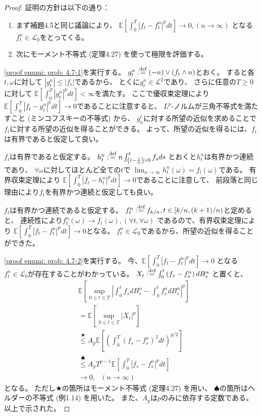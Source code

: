 \documentclass[uplatex]{jsarticle}
\theoremstyle{definition}
\def\E{\mathbb{E}}
\def\mcL{\mathcal{L}}
\def\dfn{:\overset{\mbox{{\scriptsize def}}}{=}}
\begin{document}
\begin{proof}
  証明の方針は以下の通り：
  \begin{enumerate}
    \item \label{proof enumi: prob: 4.7-1}
    まず補題4.5と同じ議論により、
    \(\E\left[ \int_0^T|f_t-f_t^n|^pdt \right]\to 0, (n\to \infty)\)
    となる\(f_t^n\in \mcL_0\)をとってくる。
    \item \label{proof enumi: prob: 4.7-2}
    次にモーメント不等式 (定理4.27) を使って極限を評価する。
  \end{enumerate}

  \ref{proof enumi: prob: 4.7-1}を実行する。
  \(g_t^n \dfn (-n)\vee (f_t\wedge n)\)とおく。
  すると各\(t,\omega\)に対して
  \(|g_t^n| \leq |f_t|\)であるから、
  とくに\(g_t^n\in \mcL^2\)であり、
  さらに任意の\(T\geq 0\)に対して
  \(\E\left[ \int_0^T|g_t^n|^pdt\right] < \infty\)を満たす。
  ここで優収束定理により
  \(\E\left[ \int_0^T|f_t-g_t^n|^pdt\right] \to 0\)であることに注意すると、
  \(L^p\)-ノルムが三角不等式を満たすこと (ミンコフスキーの不等式) から、
  \(g_n^t\)に対する所望の近似を求めることで
  \(f_t\)に対する所望の近似を得ることができる。
  よって、所望の近似を得るには、\(f_t\)は有界であると仮定して良い。

  \(f_t\)は有界であると仮定する。
  \(h_t^n \dfn n\int_{\left(t-\frac{1}{n}\right)\vee 0}^t f_sds\)
  とおくと\(h_t^n\)は有界かつ連続であり、
  \(\forall \omega\)に対してほとんど全ての\(t\)で
  \(\lim_{n\to \infty}h_t^n(\omega) = f_t(\omega)\)である。
  有界収束定理により
  \(\E\left[ \int_0^T|f_t-h_t^n|^pdt\right] \to 0\)であることに注意して、
  前段落と同じ理由により\(f_t\)を有界かつ連続と仮定しても良い。

  \(f_t\)は有界かつ連続であると仮定する。
  \(f_t^n \dfn f_{k/n}, t\in [k/n,(k+1)/n)\)と定めると、
  連続性により\(f_t^n(\omega)\to f_t(\omega) , (\forall t,\forall \omega)\)
  であるので、有界収束定理により
  \(\E\left[ \int_0^T|f_t-f_t^n|^pdt\right] \to 0\)となる。
  \(f_t^n\in \mcL_0\)であるから、所望の近似を得ることができた。

  \ref{proof enumi: prob: 4.7-2}を実行する。
  今、\(\E\left[ \int_0^T|f_t-f_t^n|^pdt\right] \to 0\)
  となる\(f_t^n\in \mcL_0\)が存在することがわかっている。
  \(X_t \dfn \int_0^t\left( f_s - f_s^n\right) dB_s^\alpha\)
  と置くと、
  \begin{align*}
    &\E\left[ \sup_{0\leq t\leq T}\left|
    \int_0^tf_sdB_s^\alpha - \int_0^tf_s^ndB_s^\alpha \right|^p\right] \\
    &= \E\left[ \sup_{0\leq t\leq T}\left| X_t\right|^p \right] \\
    &\overset{\bigstar}{\leq} A_p \E\left[ \left(
    \int_0^T\left( f_s - f_s^n\right)^2dt \right)^{p/2}\right] \\
    &\overset{\spadesuit}{\leq} A_pT^{p-1} \E\left[
    \int_0^T\left| f_s - f_s^n\right|^pdt \right] \\
    &\to 0 , \ \ \ (n\to\infty)
  \end{align*}
  となる。
  ただし\(\bigstar\)の箇所はモーメント不等式 (定理4.27) を用い、
  \(\spadesuit\)の箇所はヘルダーの不等式 (例1.14) を用いた。
  また、\(A_p\)は\(p\)のみに依存する定数である。
  以上で示された。
\end{proof}
\end{document}
